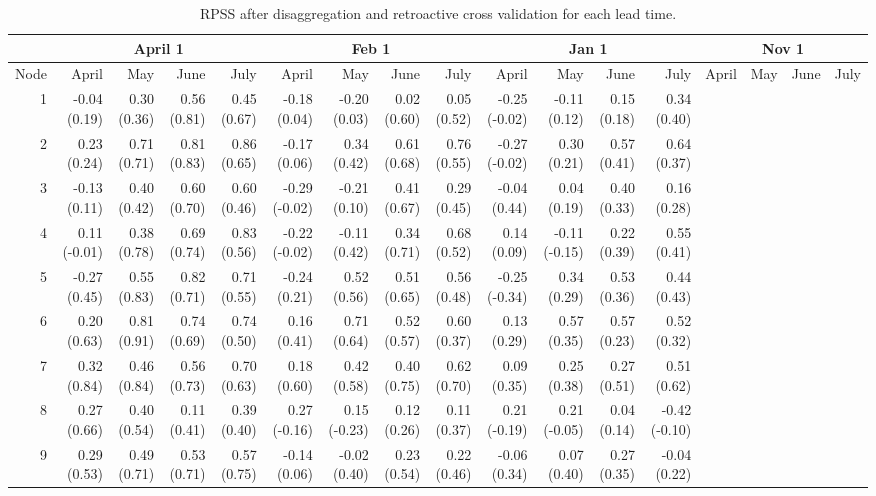 \begin{sidewaystable}[ht]
\begin{center}
\caption{RPSS after disaggregation and retroactive cross validation for each lead time.}\label{tab:retro}
\begin{tabular}{rrrrr|rrrr|rrrr|rrrr}
  \toprule
  &\multicolumn{4}{c}{April 1} & \multicolumn{4}{c}{Feb 1} & \multicolumn{4}{c}{Jan 1} & \multicolumn{4}{c}{Nov 1}\\
  \midrule
Node & April & May & June & July & April & May & June & July & April & May & June & July & April & May & June & July \\ 
  \midrule
  1 & -0.04 (0.19) & 0.30 (0.36) & 0.56 (0.81) & 0.45 (0.67) & -0.18 (0.04) & -0.20 (0.03) & 0.02 (0.60) & 0.05 (0.52) & -0.25 (-0.02) & -0.11 (0.12) & 0.15 (0.18) & 0.34 (0.40) \\ 
    2 & 0.23 (0.24) & 0.71 (0.71) & 0.81 (0.83) & 0.86 (0.65) & -0.17 (0.06) & 0.34 (0.42) & 0.61 (0.68) & 0.76 (0.55) & -0.27 (-0.02) & 0.30 (0.21) & 0.57 (0.41) & 0.64 (0.37) \\ 
    3 & -0.13 (0.11) & 0.40 (0.42) & 0.60 (0.70) & 0.60 (0.46) & -0.29 (-0.02) & -0.21 (0.10) & 0.41 (0.67) & 0.29 (0.45) & -0.04 (0.44) & 0.04 (0.19) & 0.40 (0.33) & 0.16 (0.28) \\ 
    4 & 0.11 (-0.01) & 0.38 (0.78) & 0.69 (0.74) & 0.83 (0.56) & -0.22 (-0.02) & -0.11 (0.42) & 0.34 (0.71) & 0.68 (0.52) & 0.14 (0.09) & -0.11 (-0.15) & 0.22 (0.39) & 0.55 (0.41) \\ 
    5 & -0.27 (0.45) & 0.55 (0.83) & 0.82 (0.71) & 0.71 (0.55) & -0.24 (0.21) & 0.52 (0.56) & 0.51 (0.65) & 0.56 (0.48) & -0.25 (-0.34) & 0.34 (0.29) & 0.53 (0.36) & 0.44 (0.43) \\ 
    6 & 0.20 (0.63) & 0.81 (0.91) & 0.74 (0.69) & 0.74 (0.50) & 0.16 (0.41) & 0.71 (0.64) & 0.52 (0.57) & 0.60 (0.37) & 0.13 (0.29) & 0.57 (0.35) & 0.57 (0.23) & 0.52 (0.32) \\ 
    7 & 0.32 (0.84) & 0.46 (0.84) & 0.56 (0.73) & 0.70 (0.63) & 0.18 (0.60) & 0.42 (0.58) & 0.40 (0.75) & 0.62 (0.70) & 0.09 (0.35) & 0.25 (0.38) & 0.27 (0.51) & 0.51 (0.62) \\ 
    8 & 0.27 (0.66) & 0.40 (0.54) & 0.11 (0.41) & 0.39 (0.40) & 0.27 (-0.16) & 0.15 (-0.23) & 0.12 (0.26) & 0.11 (0.37) & 0.21 (-0.19) & 0.21 (-0.05) & 0.04 (0.14) & -0.42 (-0.10) \\ 
    9 & 0.29 (0.53) & 0.49 (0.71) & 0.53 (0.71) & 0.57 (0.75) & -0.14 (0.06) & -0.02 (0.40) & 0.23 (0.54) & 0.22 (0.46) & -0.06 (0.34) & 0.07 (0.40) & 0.27 (0.35) & -0.04 (0.22) \\ 

\end{tabular}
\end{center}
\end{sidewaystable}
